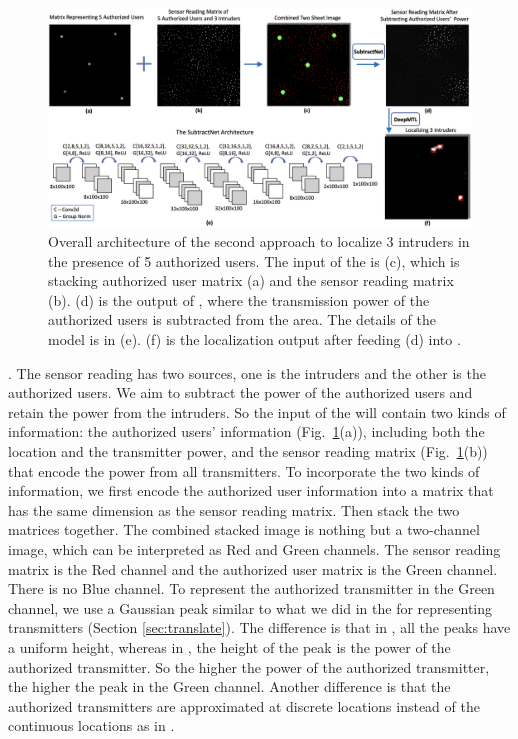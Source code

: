 \begin{figure}
    \centering
    \includegraphics[width=\textwidth]{chapters/wowmom-pmc/figures/subtractnet2.png}
    \caption{Overall architecture of the second approach to localize 3 intruders in the presence of 5 authorized users. The input of the \subtract is (c), which is stacking authorized user matrix (a) and the sensor reading matrix (b). (d) is the output of \subtract, where the transmission power of the authorized users is subtracted from the area. The details of the \subtract model is in (e). (f) is the localization output after feeding (d) into \our.}
    \label{fig:subtractnet}
\end{figure}

. The sensor reading has two sources, one is the intruders and the other is the authorized users.
We aim to subtract the power of the authorized users and retain the power from the intruders.
So the input of the \subtract will contain two kinds of information: the authorized users' information (Fig.~\ref{fig:subtractnet}(a)), including both the location and the transmitter power, and the sensor reading matrix (Fig.~\ref{fig:subtractnet}(b)) that encode the power from all transmitters.
To incorporate the two kinds of information, we first encode the authorized user information into a matrix that has the same dimension as the sensor reading matrix.
Then stack the two matrices together.
The combined stacked image is nothing but a two-channel image, which can be interpreted as Red and Green channels.
The sensor reading matrix is the Red channel and the authorized user matrix is the Green channel. There is no Blue channel.
To represent the authorized transmitter in the Green channel, we use a Gaussian peak similar to what we did in the \imgimg for representing transmitters (Section \ref{sec:translate}).
The difference is that in \imgimg, all the peaks have a uniform height, whereas in \subtract, the height of the peak is the power of the authorized transmitter.
So the higher the power of the authorized transmitter, the higher the peak in the Green channel.
Another difference is that the authorized transmitters are approximated at discrete locations instead of the continuous locations as in \imgimg.

